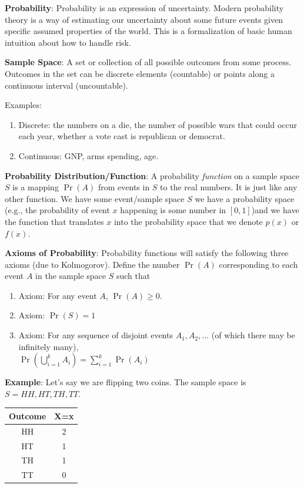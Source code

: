 \documentclass[20pt]{extarticle}
\newcommand{\be}{\begin{enumerate}}
\newcommand{\ee}{\end{enumerate}}
\begin{document}
\item {\bf Probability}: Probability is an expression of uncertainty.
  Modern probability theory is a way of estimating our uncertainty
  about some future events given specific assumed properties of the
  world.  This is a formalization of basic human intuition about how
  to handle risk.  

\item {\bf Sample Space}: A set or collection of all possible outcomes
  from some process.  Outcomes in the set can be discrete elements
  (countable) or points along a continuous interval (uncountable).
\item Examples:
  \be
  \item Discrete:  the numbers on a die, the number of possible wars
        that could occur each year, whether a vote cast is republican
    or democrat.
  \item Continuous: GNP, arms spending, age.
  \ee

\item {\bf Probability Distribution/Function}: A probability \textit{function} on a
  sample space $S$ is a mapping $\Pr(A)$ from events in $S$ to the
  real numbers.  It is just like any other function.  We have some
  event/sample space $S$ we have a probability space (e.g., the
  probability of event $x$ happening is some number in $[0,1]$)and we have the
  function that translates $x$ into the probability space that we
  denote $p(x)$ or $f(x)$.  

\item {\bf Axioms of Probability}: Probability functions will satisfy
  the following three axioms (due to Kolmogorov). Define the number
  $\Pr(A)$ corresponding to each event $A$ in the sample space $S$ such
  that \be
  \item Axiom:  For any event $A$, $\Pr(A)\ge 0$.
  \item Axiom:  $\Pr(S)=1$
  \item Axiom: For any sequence of disjoint events
    $A_1,A_2,\ldots$ (of which there may be infinitely many),\\
    $\Pr\left( \bigcup\limits_{i=1}^k A_i\right)=\sum\limits_{i=1}^k
    \Pr(A_i)$ \ee



\item {\bf Example}: Let's say we are flipping two coins.  The sample
  space is $S={HH, HT, TH, TT}$.  


\begin{center}
\begin{tabular}{c | c}
\hline
Outcome & X=x \\
\hline
HH & 2 \\
HT & 1 \\
TH & 1 \\
TT & 0 \\
\hline
\end{tabular}
\end{center}
\end{document}

